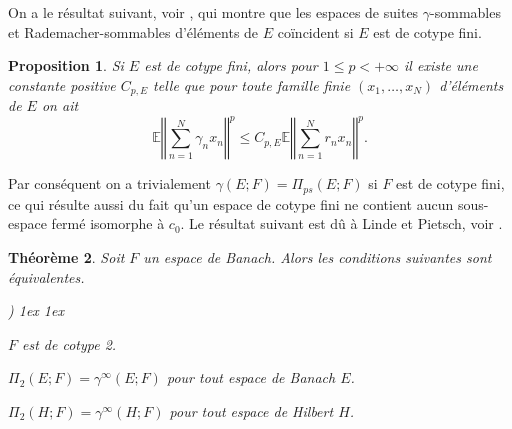 \documentclass{smfart}
\theoremstyle{plain}
\newtheorem{theorem}{Théorème}[section]
\newtheorem{proposition}[theorem]{Proposition}
\theoremstyle{definition}
\newcommand{\EE}{\mathbb E}
\newcounter{aufzi}
\newenvironment{aufzi}{\begin{list}{ {\upshape\alph{aufzi})}}{
        \usecounter{aufzi}
        \topsep1ex
        \parsep0cm
        \itemsep1ex
        \leftmargin0.8cm
        \labelwidth0.5cm
        \labelsep0.3cm
}}
{\end{list}}
\begin{document}
\smallskip

On a le résultat suivant, voir \cite[Proposition 2.6]{jvn}, qui montre que
les espaces de suites $\gamma$-sommables et Rademacher-sommables
d'éléments de $E$ coïncident si $E$ est de cotype
fini.

\begin{proposition} 
  Si $E$ est de cotype fini, alors pour $1 \le p <+\infty$ il existe
  une constante positive $C_{p,E}$ telle que pour toute famille finie
  $(x_1,\dots, x_N)$ d'éléments de $E$ on ait
\[
     \EE \left \Vert \sum \limits_{n=1}^{N} \gamma_nx_n\right \Vert^p\le C_{p,E} \EE \left \Vert \sum \limits_{n=1}^{N} r_nx_n\right \Vert^p.
\]
\end{proposition}

\noindent Par conséquent on a trivialement $\gamma(E; F)=\Pi_{ps}(E; F)$ si $F$
est de cotype fini, ce qui résulte aussi du fait qu'un espace de
cotype fini ne contient aucun sous-espace fermé isomorphe à $c_0$.
Le résultat suivant est dû à Linde et Pietsch, voir 
\cite{lp,Pietsch,mau}.

\begin{theorem} \label{thm:LP-cotype2}
  Soit $F$ un espace de Banach. Alors les conditions suivantes sont
  équivalentes.
  \begin{aufzi}
  \item \label{item:LP-cotype2-c} $F$ est de cotype 2.
  \item \label{item:LP-cotype2-a} $\Pi_{2}(E; F)=\gamma^{\infty}(E; F)$ pour tout espace de Banach
    $E$.
  \item \label{item:LP-cotype2-b} $\Pi_{2}(H;F)=\gamma^{\infty}(H;F)$ pour tout espace de
    Hilbert $H$.
  \end{aufzi}
\end{theorem}
\end{document}
